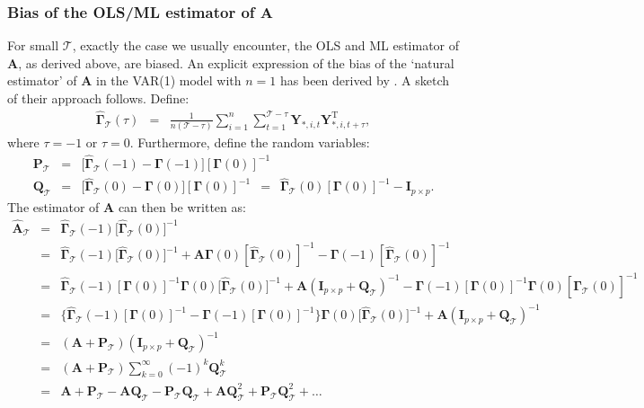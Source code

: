 \documentclass[a4paper]{article}
\theoremstyle{myexamplestyle}
\begin{document}
\subsubsection{Bias of the OLS/ML estimator of $\mathbf{A}$}
For small $\mathcal{T}$, exactly the case we usually encounter, the OLS and ML estimator of $\mathbf{A}$, as derived above, are biased. An explicit expression of the bias of the `natural estimator' of $\mathbf{A}$ in the VAR(1) model with $n=1$ has been derived by \cite{Nich1988}. A sketch of their  approach follows. Define:
\begin{eqnarray*}
\hat{\mathbf{\Gamma}}_{\mathcal{T}} (\tau) & = &  \frac{1}{n(\mathcal{T}-\tau)} \sum_{i=1}^n \sum_{t=1}^{\mathcal{T}-\tau}  \mathbf{Y}_{\ast,i,t} \mathbf{Y}_{\ast,i,t+\tau}^{\mathrm{T}},
\end{eqnarray*}
where $\tau = -1$ or $\tau = 0$. Furthermore, define the random variables:
\begin{eqnarray*}
\mathbf{P}_{\mathcal{T}} & = & \big[ \hat{\mathbf{\Gamma}}_{\mathcal{T}}(-1) - \mathbf{\Gamma}(-1) \big] [\mathbf{\Gamma}(0)]^{-1}
\\
\mathbf{Q}_{\mathcal{T}} & = & \big[ \hat{\mathbf{\Gamma}}_{\mathcal{T}}(0) - \mathbf{\Gamma}(0) \big] [\mathbf{\Gamma}(0)]^{-1} \, \, \, = \, \, \,
\hat{\mathbf{\Gamma}}_{\mathcal{T}}(0) [\mathbf{\Gamma}(0)]^{-1} - \mathbf{I}_{p \times p}.
\end{eqnarray*}
The estimator of $\mathbf{A}$ can then be written as:
\begin{eqnarray*}
\hat{\mathbf{A}}_{\mathcal{T}} & = &  \hat{\mathbf{\Gamma}}_{\mathcal{T}}(-1) \big[ \hat{\mathbf{\Gamma}}_{\mathcal{T}}(0) ]^{-1}
\\
& = & \hat{\mathbf{\Gamma}}_{\mathcal{T}}(-1) \big[ \hat{\mathbf{\Gamma}}_{\mathcal{T}}(0) ]^{-1}  +  \mathbf{A} \mathbf{\Gamma}(0) [\hat{\mathbf{\Gamma}}_{\mathcal{T}}(0)]^{-1}   - \mathbf{\Gamma}(-1) [\hat{\mathbf{\Gamma}}_{\mathcal{T}}(0)]^{-1}
\\
& = & \hat{\mathbf{\Gamma}}_{\mathcal{T}}(-1) [\mathbf{\Gamma}(0)]^{-1}  \mathbf{\Gamma}(0) \big[ \hat{\mathbf{\Gamma}}_{\mathcal{T}}(0) ]^{-1} +  \mathbf{A} (\mathbf{I}_{p \times p} + \mathbf{Q}_{\mathcal{T}})^{-1}  - \mathbf{\Gamma}(-1) [\mathbf{\Gamma}(0)]^{-1} \mathbf{\Gamma}(0)  [\hat{\mathbf{\Gamma}}_{\mathcal{T}}(0)]^{-1}
\\
& = & \{ \hat{\mathbf{\Gamma}}_{\mathcal{T}}(-1) [\mathbf{\Gamma}(0)]^{-1}   - \mathbf{\Gamma}(-1) [\mathbf{\Gamma}(0)]^{-1}  \}
\mathbf{\Gamma}(0)  \big[ \hat{\mathbf{\Gamma}}_{\mathcal{T}}(0) \big]^{-1} +  \mathbf{A} (\mathbf{I}_{p \times p} + \mathbf{Q}_{\mathcal{T}})^{-1}
\\
& = & (\mathbf{A} + \mathbf{P}_{\mathcal{T}}) (\mathbf{I}_{p \times p} + \mathbf{Q}_{\mathcal{T}})^{-1}
\\
& = & (\mathbf{A} + \mathbf{P}_{\mathcal{T}} )  \sum_{k=0}^{\infty} (-1)^k \mathbf{Q}_{\mathcal{T}}^k
\\
& = &  \mathbf{A} + \mathbf{P}_{\mathcal{T}} - \mathbf{A} \mathbf{Q}_{\mathcal{T}}   - \mathbf{P}_{\mathcal{T}} \mathbf{Q}_{\mathcal{T}}  + \mathbf{A} \mathbf{Q}_{\mathcal{T}}^2   + \mathbf{P}_{\mathcal{T}} \mathbf{Q}_{\mathcal{T}}^2  + \ldots
\end{eqnarray*}
\end{document}
